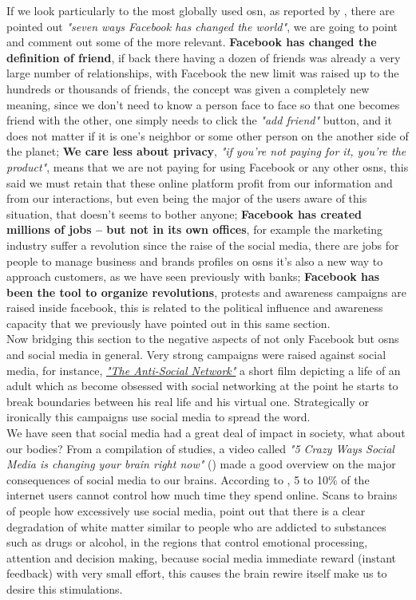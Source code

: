 \indent If we look particularly to the most globally used \gls{osn}, as reported by \cite{relrevfacebook}, there are pointed out \textit{"seven ways Facebook has changed the world"}, we are going to point and comment out some of the more relevant. \textbf{Facebook has changed the definition of friend}, if back there having a dozen of friends was already a very large number of relationships, with Facebook the new limit was raised up to the hundreds or thousands of friends, the concept was given a completely new meaning, since we don't need to know a person face to face so that one becomes friend with the other, one simply needs to click the \textit{"add friend"} button, and it does not matter if it is one's neighbor or some other person on the another side of the planet; \textbf{We care less about privacy}, \textit{"if you’re not paying for it, you’re the product"}, means that we are not paying for using Facebook or any other \glspl{osn}, this said we must retain that these online platform profit from our information and from our interactions, but even being the major of the users aware of this situation, that doesn't seems to bother anyone; \textbf{Facebook has created millions of jobs – but not in its own offices}, for example the marketing industry suffer a revolution since the raise of the social media, there are jobs for people to manage business and brands profiles on \glspl{osn} it's also a new way to approach customers, as we have seen previously with banks; \textbf{Facebook has been the tool to organize revolutions}, protests and awareness campaigns are raised inside facebook, this is related to the political influence and awareness capacity that we previously have pointed out in this same section.\\
\indent Now bridging this section to the negative aspects of not only Facebook but \glspl{osn} and social media in general. Very strong campaigns were raised against social media, for instance, \href{http://www.imdb.com/title/tt3333168/}{\textit{"The Anti-Social Network"}} a short film depicting a life of an adult which as become obsessed with social networking at the point he starts to break boundaries between his real life and his virtual one. Strategically or ironically this campaigns use social media to spread the word.\\
\indent We have seen that social media had a great deal of impact in society, what about our bodies? From a compilation of studies, a video called \textit{"5 Crazy Ways Social Media is changing your brain right now"} (\cite{asapscience}) made a good overview on the major consequences of social media to our brains. According to \cite{asapscience}, 5 to 10\% of the internet users cannot control how much time they spend online. Scans to brains of people how excessively use social media, point out that there is a clear degradation of white matter similar to people who are addicted to substances such as drugs or alcohol, in the regions that control emotional processing, attention and decision making, because social media immediate reward (instant feedback) with very small effort, this causes the brain rewire itself make us to desire this stimulations.
